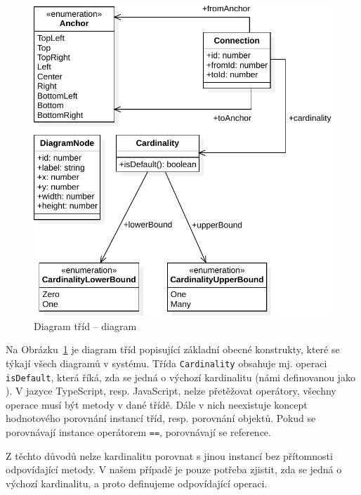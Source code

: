 \begin{figure}[!htb]
  \centering
  \includegraphics[width=\maxwidth{\textwidth}]{../img/diagrams/diagram-class-diagram.pdf}
  \caption{Diagram tříd -- diagram}
  \label{fig:diagram-class-diagram}
\end{figure}

Na Obrázku~\ref{fig:diagram-class-diagram} je diagram tříd popisující základní obecné konstrukty, které se týkají všech diagramů v systému.
Třída \texttt{Cardinality} obsahuje mj. operaci \texttt{isDefault}, která říká, zda se jedná o výchozí kardinalitu (námi definovanou jako \oneone).
V jazyce TypeScript, resp. JavaScript, nelze přetěžovat operátory, všechny operace musí být metody v dané třídě.
Dále v nich neexistuje koncept hodnotového porovnání instancí tříd, resp. porovnání objektů.
Pokud se porovnávají instance operátorem \texttt{==}, porovnávají se reference.

Z těchto důvodů nelze kardinalitu porovnat s jinou instancí bez přítomnosti odpovídající metody.
V našem případě je pouze potřeba zjistit, zda se jedná o výchozí kardinalitu, a proto definujeme odpovídající operaci.

